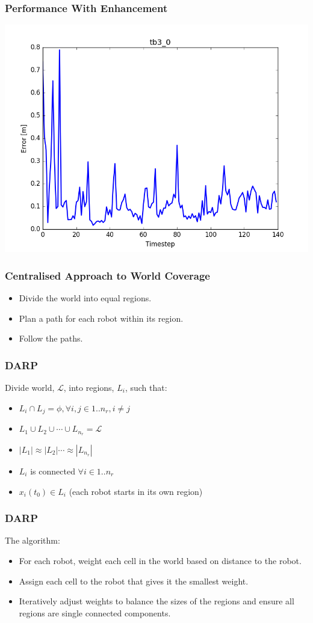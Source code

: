 \documentclass{beamer}
\begin{document}
	\begin{frame}
		\frametitle{Performance With Enhancement}
		\includegraphics[width=\columnwidth]{figure_l1.png}
	\end{frame}
	\begin{frame}
		\frametitle{Centralised Approach to World Coverage}
		\pause
		\begin {itemize}
			\item<2-> Divide the world into equal regions.
			\item<3-> Plan a path for each robot within its region.
			\item<4-> Follow the paths.	
		\end {itemize}
	\end{frame}
	\begin{frame}
		\frametitle{DARP}
		Divide world, $\mathcal{L}$, into regions, $L_i$, such that:
		\begin{itemize}
			\item<2-> $L_i \cap L_j = \phi, \forall i, j  \in 1..n_r, i \neq j$
			\item<3-> $L_1 \cup L_2 \cup \cdots \cup L_{n_r} = \mathcal{L}$
			\item<4-> $|L_1| \approx |L_2| \cdots \approx |L_{n_r}|$
			\item<5-> $L_i$ is connected $\forall i\in 1..n_r$
			\item<6-> $x_i(t_0) \in L_i$ (each robot starts in its own region)
		\end{itemize}
	\end{frame}

	\begin{frame}
		\frametitle{DARP}
		The algorithm:
		\begin{itemize}
			\item<2-> For each robot, weight each cell in the world based on distance to the robot.
			\item<3-> Assign each cell to the robot that gives it the smallest weight.
			\item<4-> Iteratively adjust weights to balance the sizes of the regions and ensure all regions are single connected components.
		\end{itemize}
	
	\end{frame}
	
\end{document}

